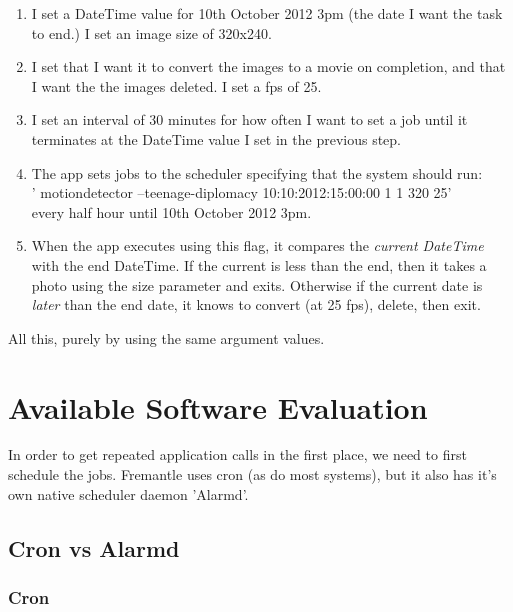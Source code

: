 \begin{enumerate}
\item I set a DateTime value for 10th October 2012 3pm (the date I want the task to end.)  I set an image size of 320x240.\\
\vspace{-20pt}
\item I set that I want it to convert the images to a movie on completion, and that I want the the images deleted. I set a fps of 25.\\
\vspace{-20pt}
\item I set an interval of 30 minutes for how often I want to set a job until it terminates at the DateTime value I set in the previous step.\\
\vspace{-20pt}
\item The app sets jobs to the scheduler specifying that the system should run:\\
 ' motiondetector --teenage-diplomacy 10:10:2012:15:00:00   1  1  320 25' \\
every half hour until 10th October 2012 3pm.
\vspace{-8pt}
\item When the app executes using this flag, it compares the {\it current DateTime} with the end DateTime. If the current is less than the end, then it takes a photo using the size parameter and exits. Otherwise if the current date is {\it later} than the end date, it knows to convert (at 25 fps), delete, then exit.
\end{enumerate}
All this, purely by using the same argument values.

\section{Available Software Evaluation}
In order to get repeated application calls in the first place, we need to first schedule the jobs. Fremantle uses cron (as do most systems), but it also has it's own native scheduler daemon 'Alarmd'.

\subsection{Cron vs Alarmd}
\subsubsection{Cron}

